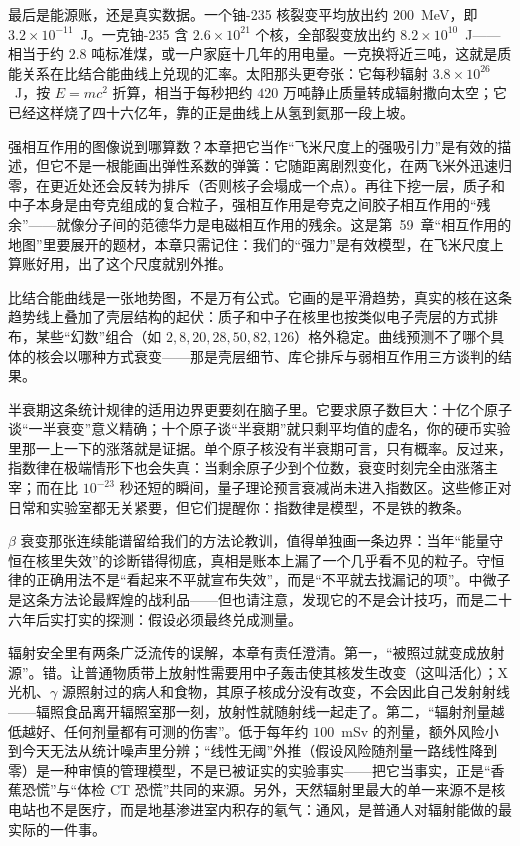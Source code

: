 最后是能源账，还是真实数据。一个铀-235 核裂变平均放出约 \(200\)~MeV，即 \(3.2\times10^{-11}\)~J。一克铀-235 含 \(2.6\times10^{21}\) 个核，全部裂变放出约 \(8.2\times10^{10}\)~J——相当于约 \(2.8\) 吨标准煤，或一户家庭十几年的用电量。一克换将近三吨，这就是质能关系在比结合能曲线上兑现的汇率。太阳那头更夸张：它每秒辐射 \(3.8\times10^{26}\)~J，按 \(E=mc^2\) 折算，相当于每秒把约 \(420\) 万吨静止质量转成辐射撒向太空；它已经这样烧了四十六亿年，靠的正是曲线上从氢到氦那一段上坡。


强相互作用的图像说到哪算数？本章把它当作“飞米尺度上的强吸引力”是有效的描述，但它不是一根能画出弹性系数的弹簧：它随距离剧烈变化，在两飞米外迅速归零，在更近处还会反转为排斥（否则核子会塌成一个点）。再往下挖一层，质子和中子本身是由夸克组成的复合粒子，强相互作用是夸克之间胶子相互作用的“残余”——就像分子间的范德华力是电磁相互作用的残余。这是第~59~章“相互作用的地图”里要展开的题材，本章只需记住：我们的“强力”是有效模型，在飞米尺度上算账好用，出了这个尺度就别外推。

比结合能曲线是一张地势图，不是万有公式。它画的是平滑趋势，真实的核在这条趋势线上叠加了壳层结构的起伏：质子和中子在核里也按类似电子壳层的方式排布，某些“幻数”组合（如 \(2,8,20,28,50,82,126\)）格外稳定。曲线预测不了哪个具体的核会以哪种方式衰变——那是壳层细节、库仑排斥与弱相互作用三方谈判的结果。

半衰期这条统计规律的适用边界更要刻在脑子里。它要求原子数巨大：十亿个原子谈“一半衰变”意义精确；十个原子谈“半衰期”就只剩平均值的虚名，你的硬币实验里那一上一下的涨落就是证据。单个原子核没有半衰期可言，只有概率。反过来，指数律在极端情形下也会失真：当剩余原子少到个位数，衰变时刻完全由涨落主宰；而在比 \(10^{-23}\) 秒还短的瞬间，量子理论预言衰减尚未进入指数区。这些修正对日常和实验室都无关紧要，但它们提醒你：指数律是模型，不是铁的教条。

\(\beta\) 衰变那张连续能谱留给我们的方法论教训，值得单独画一条边界：当年“能量守恒在核里失效”的诊断错得彻底，真相是账本上漏了一个几乎看不见的粒子。守恒律的正确用法不是“看起来不平就宣布失效”，而是“不平就去找漏记的项”。中微子是这条方法论最辉煌的战利品——但也请注意，发现它的不是会计技巧，而是二十六年后实打实的探测：假设必须最终兑成测量。

辐射安全里有两条广泛流传的误解，本章有责任澄清。第一，“被照过就变成放射源”。错。让普通物质带上放射性需要用中子轰击使其核发生改变（这叫活化）；X 光机、\(\gamma\) 源照射过的病人和食物，其原子核成分没有改变，不会因此自己发射射线——辐照食品离开辐照室那一刻，放射性就随射线一起走了。第二，“辐射剂量越低越好、任何剂量都有可测的伤害”。低于每年约 \(100\)~mSv 的剂量，额外风险小到今天无法从统计噪声里分辨；“线性无阈”外推（假设风险随剂量一路线性降到零）是一种审慎的管理模型，不是已被证实的实验事实——把它当事实，正是“香蕉恐慌”与“体检 CT 恐慌”共同的来源。另外，天然辐射里最大的单一来源不是核电站也不是医疗，而是地基渗进室内积存的氡气：通风，是普通人对辐射能做的最实际的一件事。

